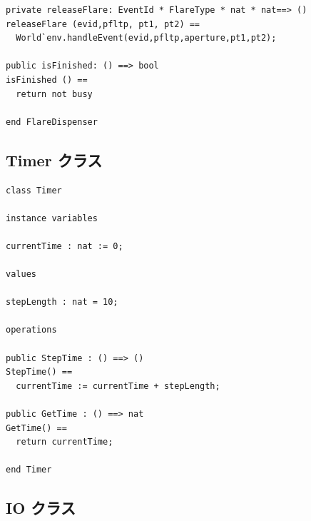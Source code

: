 \documentclass[\pformat,12pt]{jreport}
\begin{document}
\begin{lstlisting}
private releaseFlare: EventId * FlareType * nat * nat==> ()
releaseFlare (evid,pfltp, pt1, pt2) == 
  World`env.handleEvent(evid,pfltp,aperture,pt1,pt2);

public isFinished: () ==> bool
isFinished () == 
  return not busy

end FlareDispenser
\end{lstlisting}

\subsection{Timer クラス}\label{sec:timerapp}

\begin{lstlisting}
class Timer

instance variables

currentTime : nat := 0;

values

stepLength : nat = 10;

operations

public StepTime : () ==> ()
StepTime() ==
  currentTime := currentTime + stepLength;

public GetTime : () ==> nat
GetTime() ==
  return currentTime;

end Timer
\end{lstlisting}

\subsection{IO クラス}
\end{document}
